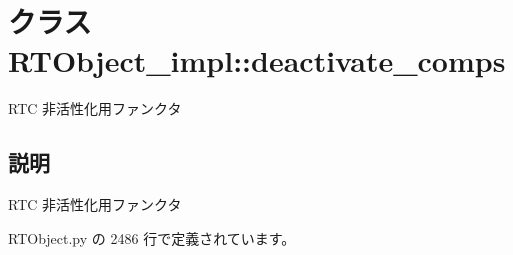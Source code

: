 \section{クラス RTObject\_\-impl::deactivate\_\-comps}
\label{classsource__py_1_1_r_t_object_1_1_r_t_object__impl_1_1deactivate__comps}
RTC 非活性化用ファンクタ  




\subsection{説明}
RTC 非活性化用ファンクタ 

 RTObject.py の 2486 行で定義されています。